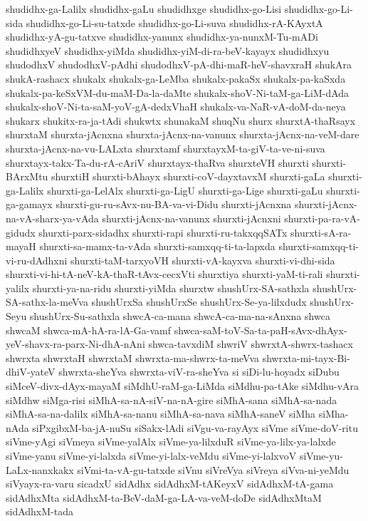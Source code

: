 {shudidhx-ga-Lalilx
shudidhx-gaLu
shudidhxge
shudidhx-go-Lisi
shudidhx-go-Li-sida
shudidhx-go-Li-su-tatxde
shudidhx-go-Li-suva
shudidhx-rA-KAyxtA
shudidhx-yA-gu-tatxve
shudidhx-yanunx
shudidhx-ya-nunxM-Tu-mADi
shudidhxyeV
shudidhx-yiMda
shudidhx-yiM-di-ra-beV-kayayx
shudidhxyu
shudodhxV
shudodhxV-pAdhi
shudodhxV-pA-dhi-maR-heV-shavxraH
shukAra
shukA-rashacx
shukalx
shukalx-ga-LeMba
shukalx-pakaSx
shukalx-pa-kaSxda
shukalx-pa-keSxVM-du-maM-Da-la-daMte
shukalx-shoV-Ni-taM-ga-LiM-dAda
shukalx-shoV-Ni-ta-saM-yoV-gA-dedxVhaH
shukalx-va-NaR-vA-doM-da-neya
shukarx
shukitx-ra-ja-tAdi
shukwtx
shunakaM
shuqNu
shurx
shurxtA-thaRsayx
shurxtaM
shurxta-jAcnxna
shurxta-jAcnx-na-vanunx
shurxta-jAcnx-na-veM-dare
shurxta-jAcnx-na-vu-LALxta
shurxtamf
shurxtayxM-ta-giV-ta-ve-ni-suva
shurxtayx-takx-Ta-du-rA-cAriV
shurxtayx-thaRva
shurxteVH
shurxti
shurxti-BArxMtu
shurxtiH
shurxti-bAhayx
shurxti-coV-dayxtavxM
shurxti-gaLa
shurxti-ga-Lalilx
shurxti-ga-LelAlx
shurxti-ga-LigU
shurxti-ga-Lige
shurxti-gaLu
shurxti-ga-gamayx
shurxti-gu-ru-sAvx-nu-BA-va-vi-Didu
shurxti-jAcnxna
shurxti-jAcnx-na-vA-sharx-ya-vAda
shurxti-jAcnx-na-vanunx
shurxti-jAcnxni
shurxti-pa-ra-vA-gidudx
shurxti-parx-sidadhx
shurxti-rapi
shurxti-ru-takxqqSATx
shurxti-sA-ra-mayaH
shurxti-sa-mamx-ta-vAda
shurxti-samxqq-ti-ta-lapxda
shurxti-samxqq-ti-vi-ru-dAdhxni
shurxti-taM-tarxyoVH
shurxti-vA-kayxva
shurxti-vi-dhi-sida
shurxti-vi-hi-tA-neV-kA-thaR-tAvx-cecxVti
shurxtiya
shurxti-yaM-ti-rali
shurxti-yalilx
shurxti-ya-na-ridu
shurxti-yiMda
shurxtw
shushUrx-SA-sathxla
shushUrx-SA-sathx-la-meVva
shushUrxSa
shushUrxSe
shushUrx-Se-ya-lilxdudx
shushUrx-Seyu
shushUrx-Su-sathxla
shwcA-ca-mana
shwcA-ca-ma-na-sAnxna
shwca
shwcaM
shwca-mA-hA-ra-lA-Ga-vamf
shwca-saM-toV-Sa-ta-paH-sAvx-dhAyx-yeV-shavx-ra-parx-Ni-dhA-nAni
shwca-tavxdiM
shwriV
shwrxtA-shwrx-tashacx
shwrxta
shwrxtaH
shwrxtaM
shwrxta-ma-shwrx-ta-meVva
shwrxta-mi-tayx-Bi-dhiV-yateV
shwrxta-sheYva
shwrxta-viV-ra-sheYva
si
siDi-lu-hoyadx
siDubu
siMceV-divx-dAyx-mayaM
siMdhU-raM-ga-LiMda
siMdhu-pa-tAke
siMdhu-vAra
siMdhw
siMga-risi
siMhA-sa-nA-siV-na-nA-gire
siMhA-sana
siMhA-sa-nada
siMhA-sa-na-dalilx
siMhA-sa-nanu
siMhA-sa-nava
siMhA-saneV
siMha
siMha-nAda
siPxgibxM-ba-jA-nuSu
siSakx-lAdi
siVgu-va-rayAyx
siVme
siVme-doV-ritu
siVme-yAgi
siVmeya
siVme-yalAlx
siVme-ya-lilxduR
siVme-ya-lilx-ya-lalxde
siVme-yanu
siVme-yi-lalxda
siVme-yi-lalx-veMdu
siVme-yi-lalxvoV
siVme-yu-LaLx-nanxkakx
siVmi-ta-vA-gu-tatxde
siVnu
siVreVya
siVreya
siVva-ni-yeMdu
siVyayx-ra-varu
sicadxU
sidAdhx
sidAdhxM-tAKeyxV
sidAdhxM-tA-gama
sidAdhxMta
sidAdhxM-ta-BeV-daM-ga-LA-va-veM-doDe
sidAdhxMtaM
sidAdhxM-tada
}
